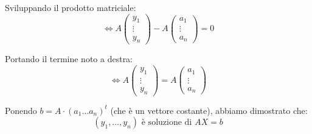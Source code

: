 {{        Sviluppando il prodotto matriciale:
        \[ \iff A \begin{pmatrix} y_1 \\ \vdots \\ y_n \end{pmatrix} - A \begin{pmatrix} a_1 \\ \vdots \\ a_n \end{pmatrix} = 0 \]
        
        Portando il termine noto a destra:
        \[ \iff A \begin{pmatrix} y_1 \\ \vdots \\ y_n \end{pmatrix} = A \begin{pmatrix} a_1 \\ \vdots \\ a_n \end{pmatrix} \]
        
        Ponendo \(b = A \cdot (a_1 \dots a_n)^t\) (che è un vettore costante), abbiamo dimostrato che:
        \[ (y_1, \dots, y_n) \text{ è soluzione di } AX = b \]
    }
}

